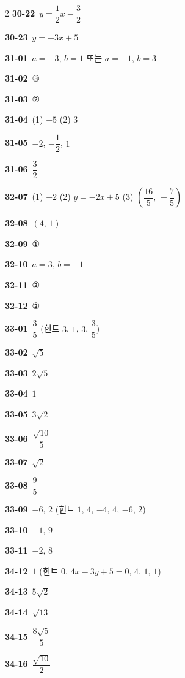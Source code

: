 \documentclass[10pt,a4paper]{article}
\begin{document}
\begin{multicols}{2}
\noindent\textbf{30-22}\ $y=\dfrac{1}{2}x-\dfrac{3}{2}$\par
\noindent\textbf{30-23}\ $y=-3x+5$\par
\noindent\textbf{31-01}\ $a=-3$, $b=1$ 또는 $a=-1$, $b=3$\par
\noindent\textbf{31-02}\ ③\par
\noindent\textbf{31-03}\ ②\par
\noindent\textbf{31-04}\ (1) $-5$ (2) $3$\par
\noindent\textbf{31-05}\ $-2$, $-\dfrac{1}{2}$, $1$\par
\noindent\textbf{31-06}\ $\dfrac{3}{2}$\par
\noindent\textbf{32-07}\ (1) $-2$ (2) $y=-2x+5$ (3) $\left(\dfrac{16}{5},\,-\dfrac{7}{5}\right)$\par
\noindent\textbf{32-08}\ $(4,\,1)$\par
\noindent\textbf{32-09}\ ①\par
\noindent\textbf{32-10}\ $a=3$, $b=-1$\par
\noindent\textbf{32-11}\ ②\par
\noindent\textbf{32-12}\ ②\par
\noindent\textbf{33-01}\ $\dfrac{3}{5}$ (힌트 $3$, $1$, $3$, $\dfrac{3}{5}$)\par
\noindent\textbf{33-02}\ $\sqrt{5}$\par
\noindent\textbf{33-03}\ $2\sqrt{5}$\par
\noindent\textbf{33-04}\ $1$\par
\noindent\textbf{33-05}\ $3\sqrt{2}$\par
\noindent\textbf{33-06}\ $\dfrac{\sqrt{10}}{5}$\par
\noindent\textbf{33-07}\ $\sqrt{2}$\par
\noindent\textbf{33-08}\ $\dfrac{9}{5}$\par
\noindent\textbf{33-09}\ $-6$, $2$ (힌트 $1$, $4$, $-4$, $4$, $-6$, $2$)\par
\noindent\textbf{33-10}\ $-1$, $9$\par
\noindent\textbf{33-11}\ $-2$, $8$\par
\noindent\textbf{34-12}\ $1$ (힌트 $0$, $4x-3y+5=0$, $4$, $1$, $1$)\par
\noindent\textbf{34-13}\ $5\sqrt{2}$\par
\noindent\textbf{34-14}\ $\sqrt{13}$\par
\noindent\textbf{34-15}\ $\dfrac{8\sqrt{5}}{5}$\par
\noindent\textbf{34-16}\ $\dfrac{\sqrt{10}}{2}$\par

\end{multicols}
\end{document}

